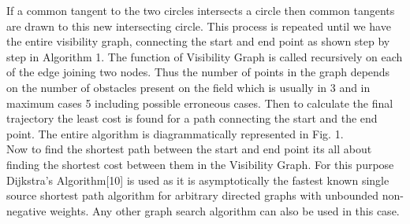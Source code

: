 \documentclass[letterpaper, 10 pt, conference]{ieeeconf}  %
\begin{document}
If a common tangent to the two circles intersects a circle then common tangents are drawn to this new intersecting circle. This process is repeated until we have the entire visibility graph, connecting the start and end point as shown step by step in Algorithm 1. The function of Visibility Graph is called recursively on each of the edge joining two nodes. Thus the number of points in the graph depends on the number of obstacles present on the field which is usually in 3 and in maximum cases 5 including possible erroneous cases. Then to calculate the final trajectory the least cost is found for a path connecting the start and the end point. The entire algorithm is diagrammatically represented in Fig. 1.\\
Now to find the shortest path between the start and end point its all about finding the shortest cost between them in the Visibility Graph. For this purpose Dijkstra's Algorithm[10] is used as it is asymptotically the fastest known single source shortest path algorithm for arbitrary directed graphs with unbounded non-negative weights. Any other graph search algorithm can also be used in this case. 
\end{document}
